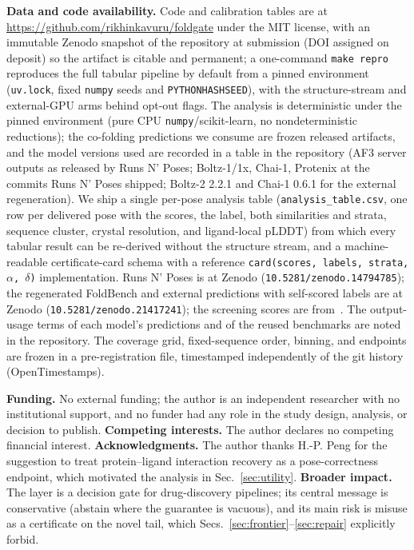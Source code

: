 \documentclass[10pt]{article}
\begin{document}
\textbf{Data and code availability.} Code and calibration tables are at
\url{https://github.com/rikhinkavuru/foldgate} under the MIT license, with an immutable Zenodo snapshot of
the repository at submission (DOI assigned on deposit) so the artifact is citable and permanent; a one-command \texttt{make repro}
reproduces the full tabular pipeline by default from a pinned environment (\texttt{uv.lock}, fixed
\texttt{numpy} seeds and \texttt{PYTHONHASHSEED}), with the structure-stream and external-GPU arms behind
opt-out flags. The analysis is deterministic under the pinned environment (pure CPU \texttt{numpy}/scikit-learn,
no nondeterministic reductions); the co-folding predictions we consume are frozen released artifacts, and the
model versions used are recorded in a table in the repository (AF3 server outputs as released by Runs N'
Poses; Boltz-1/1x, Chai-1, Protenix at the commits Runs N' Poses shipped; Boltz-2 2.2.1 and Chai-1 0.6.1 for
the external regeneration). We ship a single per-pose analysis table (\texttt{analysis\_table.csv}, one row
per delivered pose with the scores, the label, both similarities and strata, sequence cluster, crystal
resolution, and ligand-local pLDDT) from which every tabular result can be re-derived without the structure
stream, and a machine-readable certificate-card schema with a reference \texttt{card(scores, labels, strata,
$\alpha$, $\delta$)} implementation. Runs N' Poses is at Zenodo (\texttt{10.5281/zenodo.14794785}); the
regenerated FoldBench and external predictions with self-scored labels are at Zenodo
(\texttt{10.5281/zenodo.21417241}); the screening scores are from~\citet{shen2026vs}. The output-usage terms
of each model's predictions and of the reused benchmarks are noted in the repository. The coverage grid,
fixed-sequence order, binning, and endpoints are frozen in a pre-registration file, timestamped independently
of the git history (OpenTimestamps).

\textbf{Funding.} No external funding; the author is an independent researcher with no institutional
support, and no funder had any role in the study design, analysis, or decision to publish.
\textbf{Competing interests.} The author declares no competing financial interest.
\textbf{Acknowledgments.} The author thanks H.-P. Peng for the suggestion to treat protein--ligand
interaction recovery as a pose-correctness endpoint, which motivated the analysis in
Sec.~\ref{sec:utility}.
\textbf{Broader impact.} The layer is a decision gate for drug-discovery pipelines; its central message is
conservative (abstain where the guarantee is vacuous), and its main risk is misuse as a certificate on the
novel tail, which Secs.~\ref{sec:frontier}--\ref{sec:repair} explicitly forbid.
\end{document}
